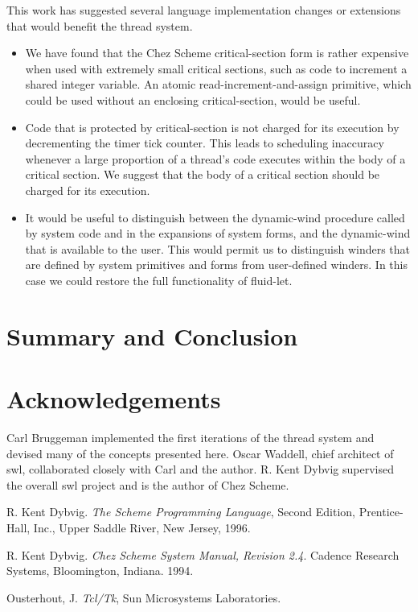 \documentclass{article}
\begin{document}
This work has suggested several language implementation changes or
extensions that would benefit the thread system.

\begin{itemize}

\item We have found that the Chez Scheme {\sf critical-section} form
is rather expensive when used with extremely small critical sections,
such as code to increment a shared integer variable.  An atomic
read-increment-and-assign primitive, which could be used without an
enclosing {\sf critical-section}, would be useful.

\item Code that is protected by {\sf critical-section} is not charged
for its execution by decrementing the timer tick counter.  This leads
to scheduling inaccuracy whenever a large proportion of a thread's
code executes within the body of a critical section.  We suggest that
the body of a critical section should be charged for its execution.

\item It would be useful to distinguish between the dynamic-wind
procedure called by system code and in the expansions of system forms,
and the dynamic-wind that is available to the user.  This would permit
us to distinguish winders that are defined by system primitives and
forms from user-defined winders.  In this case we could restore the
full functionality of {\sf fluid-let}.


\end{itemize}




\section{Summary and Conclusion}





\section{Acknowledgements}

Carl Bruggeman implemented the first iterations of the thread system
and devised many of the concepts presented here.  Oscar Waddell, chief
architect of {\sc swl}, collaborated closely with Carl and the author.
R. Kent Dybvig supervised the overall {\sc swl} project and is the author of
Chez Scheme.



\begin{thebibliography}{99}

 R. Kent Dybvig. {\em The Scheme Programming Language},
Second Edition, Prentice-Hall, Inc., Upper Saddle River, New Jersey,
1996.

 R. Kent Dybvig.  {\em Chez Scheme System Manual,
Revision 2.4}.  Cadence Research Systems, Bloomington, Indiana. 1994.

 Ousterhout, J. {\em Tcl/Tk}, Sun Microsystems
Laboratories.

\end{thebibliography}
\end{document}
